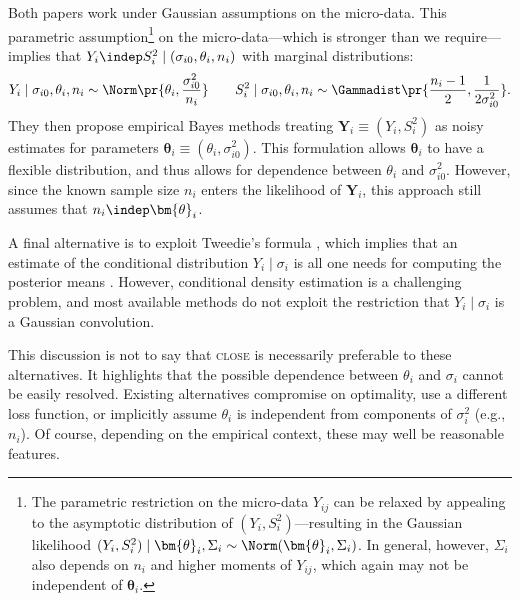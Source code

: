 \documentclass[12pt, reqno]{amsart}
\newcommand{\bY}{\mathbf{Y}}
\newcommand{\btheta}{\bm{\theta}}
\newcommand{\close}{\textsc{close}}
\numberwithin{equation}{section}
\begin{document}
\begin{refsection}
\begin{appendices}
\begin{altsq}
Both papers work under Gaussian assumptions on the micro-data. This parametric
assumption\footnote{The parametric restriction on the micro-data $Y_{ij}$ can be relaxed
by appealing to the asymptotic distribution of $(Y_i, S_i^2)$---resulting in the Gaussian
likelihood $(Y_i, S_i^2) \mid \btheta_i, \Sigma_i \sim \Norm(\btheta_i, \Sigma_i)$. In
general, however, $\Sigma_i$ also depends on $n_i$ and higher moments of $Y_{ij}$, which
again may not be independent of $\btheta_i$.} on the micro-data---which is stronger than
we require---implies that $Y_i \indep S_i^2 \mid (\sigma_{i0}, \theta_i, n_i)$ with
marginal distributions:
\begin{align*}
Y_i \mid \sigma_{i0}, \theta_i, n_i  \sim \Norm
\pr{\theta_i, \frac{\sigma_{i0}^2}{n_i}
}
\qquad
S_{i}^2 \mid \sigma_{i0}, \theta_i, n_i \sim
\Gammadist\pr{
  \frac{n_i - 1}{2}, \frac{1}{2\sigma_{i0}^2}
}.
  \end{align*}
They then propose empirical Bayes methods treating $\bY_i \equiv(Y_i, S_i^2)$
 as noisy estimates for parameters $\btheta_i \equiv (\theta_i, \sigma_{i0}^2)$. This
 formulation allows $\btheta_i$ to have a flexible distribution, and thus allows for
 dependence between $\theta_i$ and $\sigma_{i0}^2$. However, since the known sample size
 $n_i$ enters the likelihood of $\bY_i$, this approach still assumes that
 $n_i \indep \btheta_i$.
\end{altsq}

\begin{altsq}[$f$-modeling]
\label{alt:f-modeling}
A final alternative is to exploit Tweedie's formula \citep{efron2022exponential}, which
  implies that an estimate of the conditional distribution $Y_i \mid
 \sigma_i$ is all one needs for computing the posterior means
 \citep{brown2009nonparametric,liu2020forecasting,luo2023empirical}. However, conditional
 density estimation is a challenging problem, and most available methods do not exploit
 the restriction that $Y_i
\mid
\sigma_i$ is a Gaussian convolution. 
\end{altsq}

This discussion is not to say that \close{} is necessarily preferable to these alternatives.
It highlights that the possible dependence between $\theta_i$ and $\sigma_i$ cannot be
easily resolved. Existing alternatives compromise
on optimality, use a different loss function, or implicitly assume $\theta_i$ is
independent from components of $\sigma_i^2$ (e.g., $n_i$). Of course, depending on the
empirical context, these may well be reasonable features.













\end{appendices}
\end{refsection}
\end{document}
